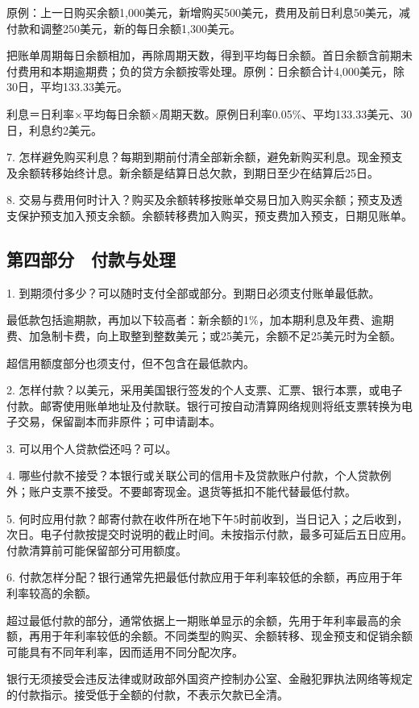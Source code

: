 \documentclass[UTF8,fontset=none,11pt,a4paper]{ctexart}
\begin{document}
原例：上一日购买余额1,000美元，新增购买500美元，费用及前日利息50美元，减付款和调整250美元，新的每日余额1,300美元。


把账单周期每日余额相加，再除周期天数，得到平均每日余额。首日余额含前期未付费用和本期逾期费；负的贷方余额按零处理。原例：日余额合计4,000美元，除30日，平均133.33美元。


利息＝日利率×平均每日余额×周期天数。原例日利率0.05\%、平均133.33美元、30日，利息约2美元。


7. 怎样避免购买利息？每期到期前付清全部新余额，避免新购买利息。现金预支及余额转移始终计息。新余额是结算日总欠款，到期日至少在结算后25日。


8. 交易与费用何时计入？购买及余额转移按账单交易日加入购买余额；预支及透支保护预支加入预支余额。余额转移费加入购买，预支费加入预支，日期见账单。


\subsection*{第四部分　付款与处理}
1. 到期须付多少？可以随时支付全部或部分。到期日必须支付账单最低款。


最低款包括逾期款，再加以下较高者：新余额的1\%，加本期利息及年费、逾期费、加急制卡费，向上取整到整数美元；或25美元，余额不足25美元时为全额。


超信用额度部分也须支付，但不包含在最低款内。


2. 怎样付款？以美元，采用美国银行签发的个人支票、汇票、银行本票，或电子付款。邮寄使用账单地址及付款联。银行可按自动清算网络规则将纸支票转换为电子交易，保留副本而非原件；可申请副本。


3. 可以用个人贷款偿还吗？可以。


4. 哪些付款不接受？本银行或关联公司的信用卡及贷款账户付款，个人贷款例外；账户支票不接受。不要邮寄现金。退货等抵扣不能代替最低付款。


5. 何时应用付款？邮寄付款在收件所在地下午5时前收到，当日记入；之后收到，次日。电子付款按提交时说明的截止时间。未按指示付款，最多可延后五日应用。付款清算前可能保留部分可用额度。


6. 付款怎样分配？银行通常先把最低付款应用于年利率较低的余额，再应用于年利率较高的余额。


超过最低付款的部分，通常依据上一期账单显示的余额，先用于年利率最高的余额，再用于年利率较低的余额。不同类型的购买、余额转移、现金预支和促销余额可能具有不同年利率，因而适用不同分配次序。


银行无须接受会违反法律或财政部外国资产控制办公室、金融犯罪执法网络等规定的付款指示。接受低于全额的付款，不表示欠款已全清。
\end{document}
